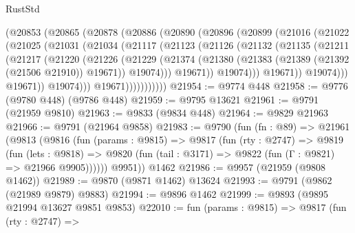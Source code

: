 \begin{lexlean}{RustStd}
\begin{coremodule}
              (@20853
                (@20865
                  (@20878
                    (@20886
                      (@20890
                        (@20896
                          (@20899
                            (@21016
                              (@21022
                                (@21025
                                  (@21031
                                    (@21034
                                      (@21117
                                        (@21123
                                          (@21126
                                            (@21132
                                              (@21135
                                                (@21211
                                                  (@21217
                                                    (@21220
                                                      (@21226
                                                        (@21229
                                                          (@21374
                                                            (@21380
                                                              (@21383
                                                                (@21389
                                                                  (@21392 (@21506 @21910))
                                                                  @19671))
                                                              @19074)))
                                                        @19671))
                                                    @19074)))
                                              @19671))
                                          @19074)))
                                    @19671))
                                @19074)))
                          @19671)))))))))))
@21954 := @9774 @448
@21958 := @9776 (@9780 @448) (@9786 @448)
@21959 := @9795 @13621
@21961 := @9791 (@21959 @9810)
@21963 := @9833 (@9834 @448)
@21964 := @9829 @21963
@21966 := @9791 (@21964 @9858)
@21983 := @9790
    (fun (fn : @89) =>
    @21961
      (@9813
        (@9816
          (fun (params : @9815) =>
          @9817
            (fun (rty : @2747) =>
            @9819
              (fun (lets : @9818) =>
              @9820 (fun (tail : @3171) => @9822 (fun (Γ : @9821) => @21966 @9905))))))
        @9951))
    @1462
@21986 := @9957 (@21959 (@9808 @1462))
@21989 := @9870 (@9871 @1462) @13624
@21993 := @9791 (@9862 (@21989 @9879) @9883)
@21994 := @9896 @1462
@21999 := @9893 (@9895 @21994 @13627 @9851 @9853)
@22010 := fun (params : @9815) =>
  @9817
    (fun (rty : @2747) =>

\end{coremodule}
\end{lexlean}
